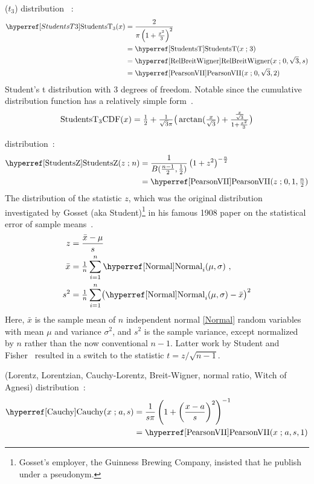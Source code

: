  ($t_3$) distribution~\cite{Devroye1986} :
\begin{align}
\label{StudentsT3}
\StudentsTTT(x)
&= \frac{2}{\pi \left( 1 + \tfrac{x^2}{3} \right)^{2} } \checked
\\ \notag 
& = \opr{StudentsT}(x\given 3) \checked
\\ \notag
& = \opr{RelBreitWigner}(x\given 0, \sqrt{3}, s) 
\\ \notag 
&= \opr{PearsonVII}(x\given 0,\sqrt{3},2) \checked
\end{align}
Student's t distribution with 3 degrees of freedom. Notable since the cumulative distribution function has a relatively simple form~\cite[p37]{Devroye1986}.
\[
\notag 
\op{StudentsT_3 CDF} (x) = \half + \sfrac{1}{\sqrt{3}\pi} \bigr( \arctan( \sfrac{x}{\sqrt{3}}) + \sfrac{\sfrac{x}{\sqrt{3}}}{1+\sfrac{x^2}{3}} \bigl) \checked
\]



  distribution~\cite{Student1908,Hanley2008}:
\begin{align}
\label{StudentsZ}
\opr{StudentsZ}(z\given n) &= \frac{1}{B(\tfrac{n-1}{2}, \tfrac{1}{2})}  \left( 1 + z^2 \right)^{-\frac{n}{2} } \checked \\
&= \opr{PearsonVII}(z\given 0,1,\tfrac{n}{2}) \notag \checked
\end{align}
The distribution of the statistic $z$, which was the original distribution investigated by Gosset (aka Student)\footnote{Gosset's employer, the Guinness Brewing Company, insisted that he publish under a pseudonym.} in his famous 1908 paper
 on the statistical error of sample means~\cite{Student1908}.
\begin{align*}
	z &= \frac {\bar{x} - \mu}{s} \\ 
	\bar{x} &= \tfrac{1}{n} \sum_{i=1}^{n} \opr{Normal}_i (\mu,\sigma) \ , \\
	s^2 &= \tfrac{1}{n} \sum_{i=1}^{n} \bigl( \opr{Normal}_i (\mu,\sigma) - \bar{x} \bigr)^2
\end{align*}
Here, $\bar{x}$ is the sample mean of $n$ independent normal \eqref{Normal} random variables with mean $\mu$ and variance  $\sigma^2$, and $s^2$ is the sample variance, except normalized by $n$ rather than the now conventional $n-1$. Latter work by Student and Fisher~\cite{Fisher1925b} resulted in a switch to the statistic $t= z/\sqrt{n-1}$.


 (Lorentz, Lorentzian, Cauchy-Lorentz,  Breit-Wigner, normal ratio, Witch of Agnesi) distribution~\cite{Poisson1827,Cauchy1853,Johnson1995}: 
%
\begin{align}
\label{Cauchy}
\opr{Cauchy}(x\given a,s) &= \frac{1}{s \pi} \left( 1 +\left( \frac{x-a}{s}\right)^2 \right)^{-1}		\checked
\\  
&= \opr{PearsonVII}(x\given a,s,1)												\checked
\notag 
\end{align}

